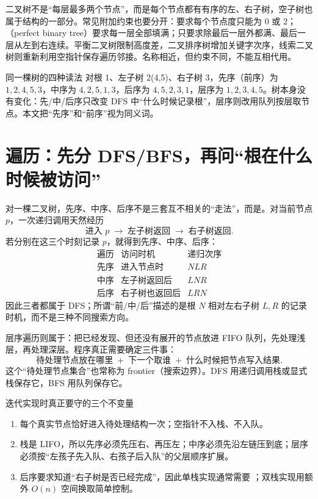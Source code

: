 \documentclass[UTF8,fontset=none,11pt,a4paper]{ctexart}
\begin{document}
二叉树不是“每层最多两个节点”，而是每个节点都有有序的左、右子树，空子树也属于结构的一部分。常见附加约束也要分开：要求每个节点度只能为 $0$ 或 $2$；（perfect binary tree）要求每一层全部填满；只要求除最后一层外都满、最后一层从左到右连续。平衡二叉树限制高度差，二叉排序树增加关键字次序，线索二叉树则重新利用空指针保存遍历邻接。名称相近，但约束不同，不能互相代用。

\begin{examplebox}{同一棵树的四种读法}
对根 1、左子树 2(4,5)、右子树 3，先序（前序）为 $1,2,4,5,3$，中序为 $4,2,5,1,3$，后序为 $4,5,2,3,1$，层序为 $1,2,3,4,5$。树本身没有变化：先/中/后序只改变 DFS 中“什么时候记录根”，层序则改用队列按层取节点。本文把“先序”和“前序”视为同义词。
\end{examplebox}

\section{遍历：先分 DFS/BFS，再问“根在什么时候被访问”}
对一棵二叉树，先序、中序、后序不是三套互不相关的“走法”，而是。对当前节点 $p$，一次递归调用天然经历
\[
\text{进入 }p\;\longrightarrow\;\text{左子树返回}\;\longrightarrow\;\text{右子树返回}.
\]
若分别在这三个时刻记录 $p$，就得到先序、中序、后序：
\[
\begin{array}{c|c|c}
\text{遍历} & \text{访问时机} & \text{递归次序}\\\hline
\text{先序} & \text{进入节点时} & NLR\\
\text{中序} & \text{左子树返回后} & LNR\\
\text{后序} & \text{右子树也返回后} & LRN
\end{array}
\]
因此三者都属于 DFS；所谓“前/中/后”描述的是根 $N$ 相对左右子树 $L,R$ 的记录时机，而不是三种不同搜索方向。

层序遍历则属于：把已经发现、但还没有展开的节点放进 FIFO 队列，先处理浅层，再处理深层。程序真正需要确定三件事：
\[
\boxed{\text{待处理节点放在哪里}\; +\; \text{下一个取谁}\; +\; \text{什么时候把节点写入结果}}.
\]
这个“待处理节点集合”也常称为 frontier（搜索边界）。DFS 用递归调用栈或显式栈保存它，BFS 用队列保存它。

\begin{methodbox}{迭代实现时真正要守的三个不变量}
\begin{enumerate}
\item {}每个真实节点恰好进入待处理结构一次；空指针不入栈、不入队。
\item {}栈是 LIFO，所以先序必须先压右、再压左；中序必须先沿左链压到底；层序必须按“左孩子先入队、右孩子后入队”的父层顺序扩展。
\item {}后序要求知道“右子树是否已经完成”，因此单栈实现通常需要 ；双栈实现用额外 $O(n)$ 空间换取简单控制。
\end{enumerate}
\end{methodbox}
\end{document}
